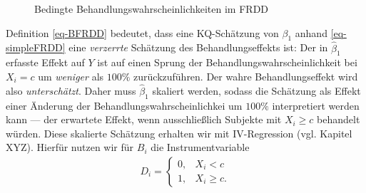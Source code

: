 \documentclass[
  a4paper,
  DIV=11,
  oneside]{scrreprt}
\begin{document}
\begin{figure}[t]


\caption{\label{fig-FRDDprobD}Bedingte Behandlungswahrscheinlichkeiten
im FRDD}

\end{figure}%

Definition \eqref{eq-BFRDD} bedeutet, dass eine KQ-Schätzung von
\(\beta_1\) anhand \eqref{eq-simpleFRDD} eine \emph{verzerrte} Schätzung
des Behandlungseffekts ist: Der in \(\widehat{\beta}_1\) erfasste Effekt
auf \(Y\) ist auf einen Sprung der Behandlungswahrscheinlichkeit bei
\(X_i = c\) um \emph{weniger} als \(100\%\) zurückzuführen. Der wahre
Behandlungseffekt wird also \emph{unterschätzt}. Daher muss
\(\widehat{\beta}_1\) skaliert werden, sodass die Schätzung als Effekt
einer Änderung der Behandlungswahrscheinlichkei um \(100\%\)
interpretiert werden kann --- der erwartete Effekt, wenn ausschließlich
Subjekte mit \(X_i\geq c\) behandelt würden. Diese skalierte Schätzung
erhalten wir mit IV-Regression (vgl. Kapitel XYZ). Hierfür nutzen wir
für \(B_i\) die Instrumentvariable \begin{align*}
  D_i = \begin{cases}
    0, & X_i < c \\ 
    1, & X_i \geq c.
  \end{cases}
\end{align*}
\end{document}

